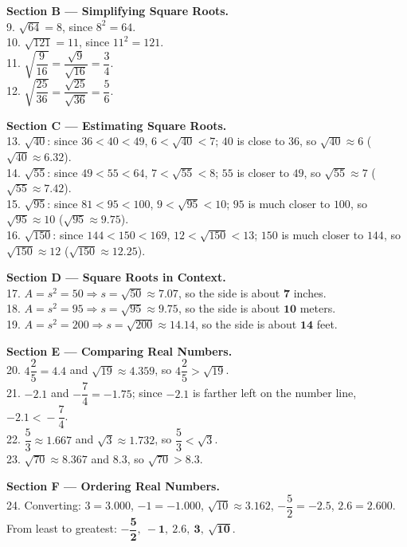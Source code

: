 \documentclass[11pt]{article}
\begin{document}
\textbf{Section B --- Simplifying Square Roots.}\\
9. $\sqrt{64}=8$, since $8^2=64$.\\
10. $\sqrt{121}=11$, since $11^2=121$.\\
11. $\sqrt{\dfrac{9}{16}}=\dfrac{\sqrt9}{\sqrt{16}}=\dfrac{3}{4}$.\\
12. $\sqrt{\dfrac{25}{36}}=\dfrac{\sqrt{25}}{\sqrt{36}}=\dfrac{5}{6}$.

\textbf{Section C --- Estimating Square Roots.}\\
13. $\sqrt{40}$: since $36<40<49$, $6<\sqrt{40}<7$; $40$ is close to $36$, so $\sqrt{40}\approx6$ ($\sqrt{40}\approx6.32$).\\
14. $\sqrt{55}$: since $49<55<64$, $7<\sqrt{55}<8$; $55$ is closer to $49$, so $\sqrt{55}\approx7$ ($\sqrt{55}\approx7.42$).\\
15. $\sqrt{95}$: since $81<95<100$, $9<\sqrt{95}<10$; $95$ is much closer to $100$, so $\sqrt{95}\approx10$ ($\sqrt{95}\approx9.75$).\\
16. $\sqrt{150}$: since $144<150<169$, $12<\sqrt{150}<13$; $150$ is much closer to $144$, so $\sqrt{150}\approx12$ ($\sqrt{150}\approx12.25$).

\textbf{Section D --- Square Roots in Context.}\\
17. $A=s^2=50 \Rightarrow s=\sqrt{50}\approx7.07$, so the side is about $\mathbf{7}$ inches.\\
18. $A=s^2=95 \Rightarrow s=\sqrt{95}\approx9.75$, so the side is about $\mathbf{10}$ meters.\\
19. $A=s^2=200 \Rightarrow s=\sqrt{200}\approx14.14$, so the side is about $\mathbf{14}$ feet.

\textbf{Section E --- Comparing Real Numbers.}\\
20. $4\dfrac25=4.4$ and $\sqrt{19}\approx4.359$, so $4\dfrac25 \mathbf{>} \sqrt{19}$.\\
21. $-2.1$ and $-\dfrac74=-1.75$; since $-2.1$ is farther left on the number line, $-2.1 \mathbf{<} -\dfrac74$.\\
22. $\dfrac53\approx1.667$ and $\sqrt3\approx1.732$, so $\dfrac53 \mathbf{<} \sqrt3$.\\
23. $\sqrt{70}\approx8.367$ and $8.3$, so $\sqrt{70} \mathbf{>} 8.3$.

\textbf{Section F --- Ordering Real Numbers.}\\
24. Converting: $3=3.000$, $-1=-1.000$, $\sqrt{10}\approx3.162$, $-\dfrac52=-2.5$, $2.6=2.600$.\\
From least to greatest: $\mathbf{-\dfrac52,\ -1,\ 2.6,\ 3,\ \sqrt{10}}$.
\end{document}

